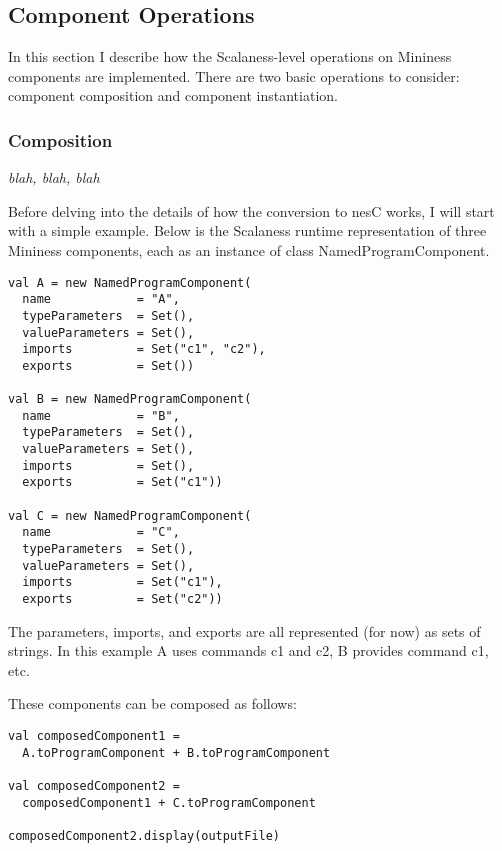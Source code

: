 \subsection{Component Operations}

In this section I describe how the Scalaness-level operations on Mininess components are
implemented. There are two basic operations to consider: component composition and component
instantiation.

\subsubsection{Composition}

\textit{blah, blah, blah}

Before delving into the details of how the conversion to nesC works, I will start with a simple
example. Below is the Scalaness runtime representation of three Mininess components, each as an
instance of class NamedProgramComponent.

\singlespace
\begin{lstlisting}[language=scalaness]
val A = new NamedProgramComponent(
  name            = "A",
  typeParameters  = Set(),
  valueParameters = Set(),
  imports         = Set("c1", "c2"),
  exports         = Set())

val B = new NamedProgramComponent(
  name            = "B",
  typeParameters  = Set(),
  valueParameters = Set(),
  imports         = Set(),
  exports         = Set("c1"))

val C = new NamedProgramComponent(
  name            = "C",
  typeParameters  = Set(),
  valueParameters = Set(),
  imports         = Set("c1"),
  exports         = Set("c2"))
\end{lstlisting}
\primaryspacing

The parameters, imports, and exports are all represented (for now) as sets of strings. In this
example A uses commands c1 and c2, B provides command c1, etc.

These components can be composed as follows:

\singlespace
\begin{lstlisting}[language=scalaness]
val composedComponent1 =
  A.toProgramComponent + B.toProgramComponent

val composedComponent2 =
  composedComponent1 + C.toProgramComponent

composedComponent2.display(outputFile)
\end{lstlisting}
\primaryspacing

